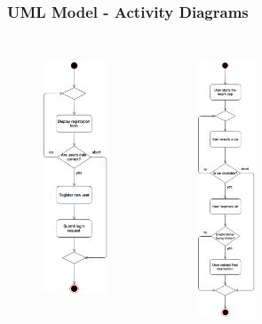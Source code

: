 \begin{frame}
	\frametitle{UML Model - Activity Diagrams}
	\begin{columns}[c]
		\begin{figure}[H]
			\centering
			\includegraphics[height=6.9cm,keepaspectratio]{figures/registration_activity_diagram.eps}
			\label{fig:registration_activity_diagram}
		\end{figure}
		\begin{figure}[H]
			\centering
			\includegraphics[height=7.6cm,keepaspectratio]{figures/reservation_activity_diagram.eps}
			\label{fig:reservation_activity_diagram}
		\end{figure}
	\end{columns}
\end{frame}

